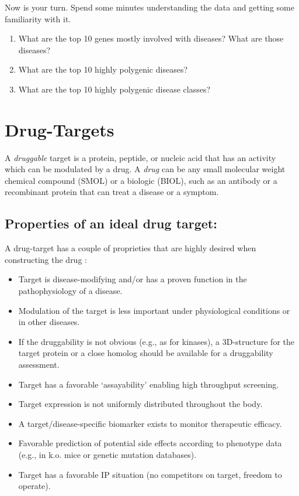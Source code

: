 \documentclass[
]{book}
\begin{document}
Now is your turn. Spend some minutes understanding the data and getting some familiarity with it.

\begin{enumerate}
\def\labelenumi{\arabic{enumi}.}
\item
  What are the top 10 genes mostly involved with diseases? What are those diseases?
\item
  What are the top 10 highly polygenic diseases?
\item
  What are the top 10 highly polygenic disease classes?
\end{enumerate}

\hypertarget{DTs}{%
\section{Drug-Targets}\label{DTs}}

A \emph{druggable} target is a protein, peptide, or nucleic acid that has an activity which can be modulated by a drug. A \emph{drug} can be any small molecular weight chemical compound (SMOL) or a biologic (BIOL), such as an antibody or a recombinant protein that can treat a disease or a symptom.

\hypertarget{properties-of-an-ideal-drug-target}{%
\subsection{Properties of an ideal drug target:}\label{properties-of-an-ideal-drug-target}}

A drug-target has a couple of proprieties that are highly desired when constructing the drug \citep{Gashaw2011}:

\begin{itemize}
\item
  Target is disease-modifying and/or has a proven function in the pathophysiology of a disease.
\item
  Modulation of the target is less important under physiological conditions or in other diseases.
\item
  If the druggability is not obvious (e.g., as for kinases), a 3D-structure for the target protein or a close homolog should be available for a druggability assessment.
\item
  Target has a favorable `assayability' enabling high throughput screening.
\item
  Target expression is not uniformly distributed throughout the body.
\item
  A target/disease-specific biomarker exists to monitor therapeutic efficacy.
\item
  Favorable prediction of potential side effects according to phenotype data (e.g., in k.o. mice or genetic mutation databases).
\item
  Target has a favorable IP situation (no competitors on target, freedom to operate).
\end{itemize}
\end{document}
